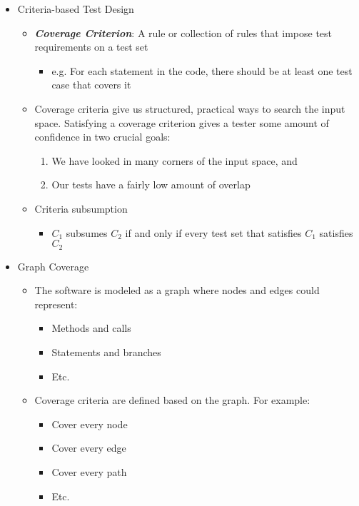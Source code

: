 \documentclass[11pt]{article}
\begin{document}
\begin{itemize}
	\item Criteria-based Test Design
		\begin{itemize}
			\item \textbf{\textit{Coverage Criterion}}: A rule or collection of rules that impose test requirements on a test set
				\begin{itemize}
					\item e.g. For each statement in the code, there should be at least one test case that covers it
				\end{itemize}
			\item Coverage criteria give us structured, practical ways to search the input space. Satisfying a coverage criterion gives a tester some amount of confidence in two crucial goals:
				\begin{enumerate}
					\item We have looked in many corners of the input space, and
					\item Our tests have a fairly low amount of overlap
				\end{enumerate}
			\item Criteria subsumption
				\begin{itemize}
					\item $ C_1 $ subsumes $ C_2 $ if and only if every test set that satisfies $ C_1 $ satisfies $ C_2 $
				\end{itemize}
		\end{itemize}

	\item Graph Coverage
		\begin{itemize}
			\item The software is modeled as a graph where nodes and edges could represent:
				\begin{itemize}
					\item Methods and calls
					\item Statements and branches
					\item Etc.
				\end{itemize}
			\item Coverage criteria are defined based on the graph. For example:
				\begin{itemize}
					\item Cover every node
					\item Cover every edge
					\item Cover every path
					\item Etc.
				\end{itemize}



\end{itemize}
\end{itemize}
\end{document}
